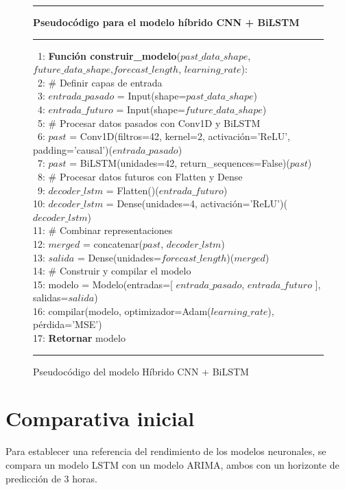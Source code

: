 \begin{figure}[H]
{\small
\hrule
{\bf\small Pseudocódigo para el modelo híbrido CNN + BiLSTM}
\hrule
\begin{center}
\begin{tabbing}
\ 1: {\bf Fun}\= {\bf ción construir\_modelo}($past\_data\_shape$, $future\_data\_shape$,$forecast\_length$, $learning\_rate$): \\
\ 2: \> \# Definir capas de entrada \\
\ 3: \> $entrada\_pasado$ = Input(shape=$past\_data\_shape$) \\
\ 4: \> $entrada\_futuro$ = Input(shape=$future\_data\_shape$) \\
\ 5: \> \# Procesar datos pasados con Conv1D y BiLSTM \\
\ 6: \> $past$ = Conv1D(filtros=42, kernel=2, activación='ReLU', padding='causal')($entrada\_pasado$) \\
\ 7: \> $past$ = BiLSTM(unidades=42, return\_sequences=False)($past$) \\
\ 8: \> \# Procesar datos futuros con Flatten y Dense \\
\ 9: \> $decoder\_lstm$ = Flatten()($entrada\_futuro$) \\
10: \> $decoder\_lstm$ = Dense(unidades=4, activación='ReLU')($decoder\_lstm$) \\
11: \> \# Combinar representaciones \\
12: \> $merged$ = concatenar($past$, $decoder\_lstm$) \\
13: \> $salida$ = Dense(unidades=$forecast\_length$)($merged$) \\
14: \> \# Construir y compilar el modelo \\
15: \> modelo = Modelo(entradas=[ $entrada\_pasado$, $entrada\_futuro$ ], salidas=$salida$) \\
16: \> compilar(modelo, optimizador=Adam($learning\_rate$), pérdida='MSE') \\
17: \> {\bf Retornar} modelo \\
\end{tabbing}
\end{center}
}
\hrule
\caption{Pseudocódigo del modelo Híbrido CNN + BiLSTM}
\label{cnn_bilstm_model}
\end{figure}


\section{Comparativa inicial}
Para establecer una referencia del rendimiento de los modelos neuronales, se compara un modelo LSTM con un modelo ARIMA, ambos con un horizonte de predicción de 3 horas.


